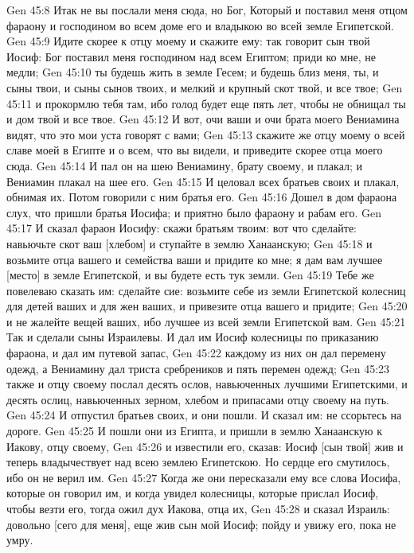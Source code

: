 \vs Gen 45:8 Итак не вы послали меня сюда, но Бог, Который и поставил меня отцом фараону и господином во всем доме его и владыкою во всей земле Египетской.
\vs Gen 45:9 Идите скорее к отцу моему и скажите ему: так говорит сын твой Иосиф: Бог поставил меня господином над всем Египтом; приди ко мне, не медли;
\vs Gen 45:10 ты будешь жить в земле Гесем; и будешь близ меня, ты, и сыны твои, и сыны сынов твоих, и мелкий и крупный скот твой, и все твое;
\vs Gen 45:11 и прокормлю тебя там, ибо голод будет еще пять лет, чтобы не обнищал ты и дом твой и все твое.
\vs Gen 45:12 И вот, очи ваши и очи брата моего Вениамина видят, что это мои уста говорят с вами;
\vs Gen 45:13 скажите же отцу моему о всей славе моей в Египте и о всем, что вы видели, и приведите скорее отца моего сюда.
\vs Gen 45:14 И пал он на шею Вениамину, брату своему, и плакал; и Вениамин плакал на шее его.
\vs Gen 45:15 И целовал всех братьев своих и плакал, обнимая их. Потом говорили с ним братья его.
\rsbpar\vs Gen 45:16 Дошел в дом фараона слух, что пришли братья Иосифа; и приятно было фараону и рабам его.
\vs Gen 45:17 И сказал фараон Иосифу: скажи братьям твоим: вот что сделайте: навьючьте скот ваш [хлебом] и ступайте в землю Ханаанскую;
\vs Gen 45:18 и возьмите отца вашего и семейства ваши и придите ко мне; я дам вам лучшее [место] в земле Египетской, и вы будете есть тук земли.
\vs Gen 45:19 Тебе же повелеваю сказать им: сделайте сие: возьмите себе из земли Египетской колесниц для детей ваших и для жен ваших, и привезите отца вашего и придите;
\vs Gen 45:20 и не жалейте вещей ваших, ибо лучшее из всей земли Египетской  вам.
\rsbpar\vs Gen 45:21 Так и сделали сыны Израилевы. И дал им Иосиф колесницы по приказанию фараона, и дал им путевой запас,
\vs Gen 45:22 каждому из них он дал перемену одежд, а Вениамину дал триста сребреников и пять перемен одежд;
\vs Gen 45:23 также и отцу своему послал десять ослов, навьюченных лучшими  Египетскими, и десять ослиц, навьюченных зерном, хлебом и припасами отцу своему на путь.
\vs Gen 45:24 И отпустил братьев своих, и они пошли. И сказал им: не ссорьтесь на дороге.
\vs Gen 45:25 И пошли они из Египта, и пришли в землю Ханаанскую к Иакову, отцу своему,
\vs Gen 45:26 и известили его, сказав: Иосиф [сын твой] жив и теперь владычествует над всею землею Египетскою. Но сердце его смутилось, ибо он не верил им.
\vs Gen 45:27 Когда же они пересказали ему все слова Иосифа, которые он говорил им, и когда увидел колесницы, которые прислал Иосиф, чтобы везти его, тогда ожил дух Иакова, отца их,
\vs Gen 45:28 и сказал Израиль: довольно [сего для меня], еще жив сын мой Иосиф; пойду и увижу его, пока не умру.
